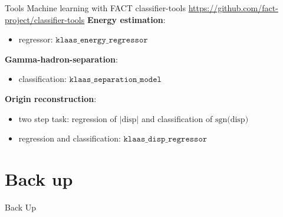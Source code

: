 \begin{frame}[t]{Tools}
Machine learning with FACT classifier-tools \url{https://github.com/fact-project/classifier-tools}
\textbf{{\color{tugreen} Energy estimation}}:
\begin{itemize}
    \item regressor: $\texttt{klaas_energy_regressor}$
\end{itemize}
\textbf{{\color{tugreen} Gamma-hadron-separation}}:
\begin{itemize}
    \item classification: $\texttt{klaas_separation_model}$
\end{itemize}
\textbf{{\color{tugreen} Origin reconstruction}}:
\begin{itemize}
    \item two step task: regression of $\text{|disp|}$ and classification of $\text{sgn(disp)}$
    \item regression and classification: $\texttt{klaas_disp_regressor}$
\end{itemize}
\end{frame}


\section{Back up}
\appendix

\begin{frame}[t]{}
  \centering
  \textcolor{tugreen}{\Huge{Back Up}}
\end{frame}


